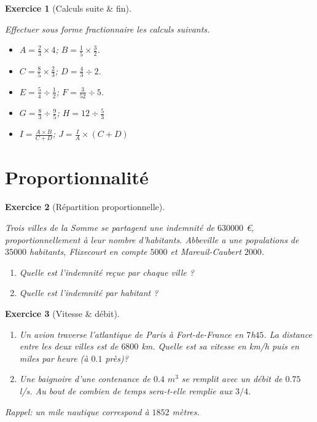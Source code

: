 \documentclass [10pt,a4paper] {article}
\newcommand{\bit} {\begin{itemize} }
\newcommand{\eit} {\end{itemize} }
\def\ben{\begin{enumerate}}
\def\een{\end{enumerate}}
\newtheorem{exo}{Exercice}
\begin{document}
\begin{exo}[Calculs suite \& fin]

\textcolor{white}{s}

Effectuer sous forme fractionnaire les calculs suivants.
\bit
\item $A = \frac{2}{3} \times 4$; $B= \frac{1}{5}\times\frac{3}{2}$.
\item $C = \frac{8}{5}\times\frac{2}{3}$; $D= \frac{4}{3}\div 2$.
\item $E = \frac{5}{4}\div\frac{1}{2}$; $F= \frac{3}{52}\div 5$.
\item $G = \frac{8}{3}\div\frac{9}{5}$; $H = 12\div\frac{5}{3}$
\item $I = \frac{A\times B}{C+D}$; $J = \frac{I}{A}\times (C+D)$
\eit
\end{exo}
\vspace{0.25cm}




\section{Proportionnalité}

\vspace{0.25cm}


\begin{exo}[Répartition proportionnelle]
\textcolor{white}{s}

Trois villes de la Somme se partagent une indemnité de $630 000$ \euro, proportionnellement à leur nombre d’habitants. \hspace{-0.2cm} Abbeville a une populations de $35000$ habitants, Flixecourt en compte $5 000$ et Mareuil-Caubert $2 000$.


\ben
\item Quelle est l’indemnité reçue par chaque ville ?
\item Quelle est l’indemnité par habitant ?
\een
\end{exo}

\vspace{0.25cm}

\begin{exo}[Vitesse \& débit]
\textcolor{white}{s}

\ben
\item Un avion traverse l’atlantique de Paris à Fort-de-France en $7$h$45$. La
distance entre les deux villes est de $6800$ km. Quelle est sa vitesse en km/h puis
en miles par heure (à $0.1$ près)?

\item Une baignoire d'une contenance de $0.4$ $m^{3}$ se remplit avec un débit de $0.75$ l/s. Au bout de
combien de temps sera-t-elle remplie aux $3/4$.
\een
Rappel: un mile nautique correspond à $1852$ mètres.
\end{exo}
\end{document}
